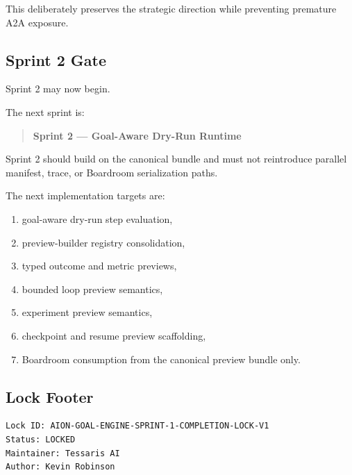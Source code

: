This deliberately preserves the strategic direction while preventing premature A2A exposure.

\subsection{Sprint 2 Gate}

Sprint 2 may now begin.

The next sprint is:

\begin{quote}
\textbf{Sprint 2 --- Goal-Aware Dry-Run Runtime}
\end{quote}

Sprint 2 should build on the canonical bundle and must not reintroduce parallel manifest, trace, or Boardroom serialization paths.

The next implementation targets are:

\begin{enumerate}
  \item goal-aware dry-run step evaluation,
  \item preview-builder registry consolidation,
  \item typed outcome and metric previews,
  \item bounded loop preview semantics,
  \item experiment preview semantics,
  \item checkpoint and resume preview scaffolding,
  \item Boardroom consumption from the canonical preview bundle only.
\end{enumerate}

\subsection{Lock Footer}

\begin{verbatim}
Lock ID: AION-GOAL-ENGINE-SPRINT-1-COMPLETION-LOCK-V1
Status: LOCKED
Maintainer: Tessaris AI
Author: Kevin Robinson
\end{verbatim}
